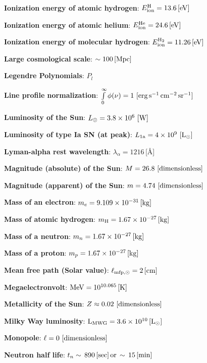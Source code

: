 \documentclass[a4paper,10pt]{article}
\begin{document}
{\noindent}\textbf{Ionization energy of atomic hydrogen}: $E_\mathrm{ion}^\mathrm{H} = 13.6\,[{\rm eV}]$

{\noindent}\textbf{Ionization energy of atomic helium}: $E_\mathrm{ion}^\mathrm{He} = 24.6\,[{\rm eV}]$

{\noindent}\textbf{Ionization energy of molecular hydrogen}: $E_\mathrm{ion}^\mathrm{H_2} = 11.26\,[{\rm eV}]$

{\noindent}\textbf{Large cosmological scale}: $\sim 100\,[{\rm Mpc}]$

{\noindent}\textbf{Legendre Polynomials}: $P_l$

{\noindent}\textbf{Line profile normalization}: $\int\limits_0^\infty \phi(\nu)=1 ~ [{\rm erg\,s^{-1}\,cm^{-2}\,sr^{-1}}]$

{\noindent}\textbf{Luminosity of the Sun}: $L_\odot=3.8\times10^6 ~ [{\rm W}]$

{\noindent}\textbf{Luminosity of type Ia SN (at peak)}: $L_\mathrm{1a}=4\times10^9 ~ [{\rm L_\odot}]$

{\noindent}\textbf{Lyman-alpha rest wavelength}: $\lambda_\alpha = 1216$\,[\AA]

{\noindent}\textbf{Magnitude (absolute) of the Sun}: $M = 26.8 ~ [{\rm dimensionless}]$

{\noindent}\textbf{Magnitude (apparent) of the Sun}: $m = 4.74 ~ [{\rm dimensionless}]$

{\noindent}\textbf{Mass of an electron}: $m_e = 9.109\times10^{-31}\,[{\rm kg}]$

{\noindent}\textbf{Mass of atomic hydrogen}: $m_{\rm H} = 1.67\times10^{-27}\,[{\rm kg}]$

{\noindent}\textbf{Mass of a neutron}: $m_n = 1.67\times10^{-27}\,[{\rm kg}]$

{\noindent}\textbf{Mass of a proton}: $m_p = 1.67\times10^{-27}\,[{\rm kg}]$

{\noindent}\textbf{Mean free path (Solar value)}: $\ell_{{\rm mfp},\odot} = 2\,[{\rm cm}]$

{\noindent}\textbf{Megaelectronvolt}: ${\rm MeV} = 10^{10.065}\,[{\rm K}]$

{\noindent}\textbf{Metallicity of the Sun}: $Z\approx0.02 ~ [{\rm dimensionless}]$

{\noindent}\textbf{Milky Way luminosity}: ${\rm L_{MWG}} = 3.6\times10^{10}\,[{\rm L}_\odot]$

{\noindent}\textbf{Monopole}: $\ell=0 ~ [{\rm dimensionless}]$

{\noindent}\textbf{Neutron half life}: $t_n\sim\,890\,[{\rm sec}]\,{\rm or}\,\sim\,15\,[{\rm min}]$
\end{document}
